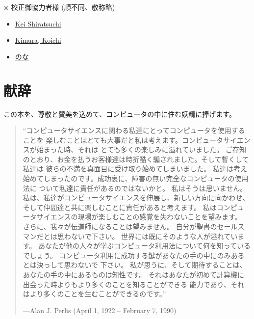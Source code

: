 \documentclass[oneside]{book}
\begin{document}
\vspace{1em}
\noindent
※ 校正御協力者様 (順不同、敬称略)

\begin{itemize}

\item \href{https://github.com/kei-s}{Kei Shiratsuchi}

\item \href{https://github.com/kimurakoichi}{Kimura, Koichi}

\item \href{https://github.com/nna774}{のな}

\end{itemize}



\chapter*{献辞}
\label{Dedication}



この本を、尊敬と賛美を込めて、コンピュータの中に住む妖精に捧げます。

\begin{quote}
``コンピュータサイエンスに関わる私達にとってコンピュータを使用することを
楽しむことはとても大事だと私は考えます。コンピュータサイエンスが始まった時、それは
とても多くの楽しみに溢れていました。
ご存知のとおり、お金を払うお客様達は時折酷く騙されました。そして暫くして私達は
彼らの不満を真面目に受け取り始めてしまいました。
私達は考え始めてしまったのです。成功裏に、障害の無い完全なコンピュータの使用法に
ついて私達に責任があるのではないかと。
私はそうは思いません。
私は、私達がコンピュータサイエンスを伸展し、新しい方向に向かわせ、
そして仲間達と共に楽しむことに責任があると考えます。
私はコンピュータサイエンスの現場が楽しむことの感覚を失わないことを望みます。
さらに、我々が伝道師になることは望みません。
自分が聖書のセールスマンだとは思わないで下さい。
世界には既にそのような人が溢れています。
あなたが他の人々が学ぶコンピュータ利用法について何を知っているでしょう。
コンピュータ利用に成功する鍵があなたの手の中にのみあるとは決っして思わないで
下さい。
 私が思うに、そして期待することは、あなたの手の中にあるものは知性です。
それはあなたが初めて計算機に出会った時よりもより多くのことを知ることができる
能力であり、それはより多くのことを生むことができるのです。''

\noindent
---Alan J. Perlis (April 1, 1922 -- February 7, 1990)
\end{quote}
\end{document}
